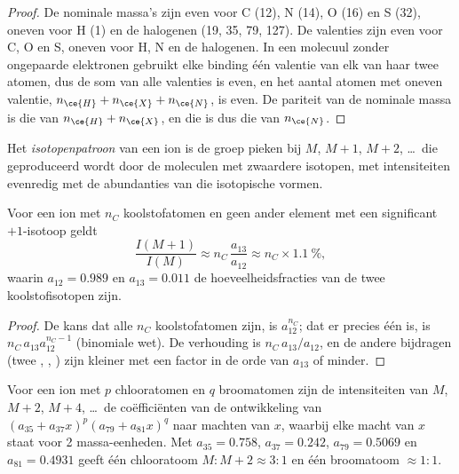\begin{proof}
De nominale massa's zijn even voor C (12), N (14), O (16) en S (32), oneven voor H (1) en de halogenen (19,
35, 79, 127). De valenties zijn even voor C, O en S, oneven voor H, N en de halogenen. In een molecuul
zonder ongepaarde elektronen gebruikt elke binding één valentie van elk van haar twee atomen, dus de som van alle
valenties is even, en het aantal atomen met oneven valentie, $n_{\ce{H}} + n_{\ce{X}} + n_{\ce{N}}$, is
even. De pariteit van de nominale massa is die van $n_{\ce{H}} + n_{\ce{X}}$, en die is dus die van
$n_{\ce{N}}$.
\end{proof}

\begin{definition}[Isotopenpatroon]\label{def:b2:mass-spec-atomic:isotope-pattern}
Het \emph{isotopenpatroon} van een ion is de groep pieken bij $M$, $M+1$,
$M+2$, \dots\ die geproduceerd wordt door de moleculen met zwaardere isotopen, met intensiteiten evenredig met
de abundanties van die isotopische vormen.
\end{definition}

\begin{proposition}[De piek $M+1$]\label{prop:b2:mass-spec-atomic:m-plus-one}
Voor een ion met $n_C$ koolstofatomen en geen ander element met een significant $+1$-isotoop geldt
\begin{equation*}
\frac{I(M+1)}{I(M)} \approx n_C\,\frac{a_{13}}{a_{12}} \approx n_C \times 1.1~\%,
\end{equation*}
waarin $a_{12} = 0.989$ en $a_{13} = 0.011$ de hoeveelheidsfracties van de twee koolstofisotopen zijn.
\end{proposition}

\begin{proof}
De kans dat alle $n_C$ koolstofatomen  zijn, is $a_{12}^{n_C}$; dat er precies één
 is, is $n_C\,a_{13}a_{12}^{n_C - 1}$ (binomiale wet). De verhouding is $n_C\,a_{13}/a_{12}$, en de
andere bijdragen (twee , , ) zijn kleiner met een factor in de orde van
$a_{13}$ of minder.
\end{proof}

\begin{proposition}\label{prop:b2:mass-spec-atomic:halogen-patterns}
Voor een ion met $p$ chlooratomen en $q$ broomatomen zijn de intensiteiten van $M$, $M+2$, $M+4$, \dots\
de coëfficiënten van de ontwikkeling van $(a_{35} + a_{37}x)^p(a_{79} + a_{81}x)^q$ naar machten van $x$, waarbij elke
macht van $x$ staat voor 2 massa-eenheden. Met $a_{35} = 0.758$, $a_{37} = 0.242$, $a_{79} = 0.5069$ en
$a_{81} = 0.4931$ geeft één chlooratoom $M : M+2 \approx 3 : 1$ en één broomatoom $\approx 1 : 1$.
\end{proposition}

